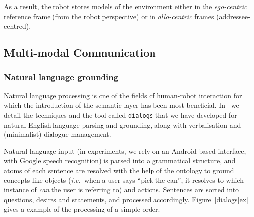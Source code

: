 \documentclass[preprint,3p,times]{elsarticle}
\newcommand{\ie}{{\textit{i.e.\ }}}
\begin{document}
As a result, the robot stores models of the environment either in the
\emph{ego-centric} reference frame (from the robot perspective) or in 
\emph{allo-centric} frames (addressee-centred).

\subsection{Multi-modal Communication}
\label{sect|com}

\subsubsection{Natural language grounding}

Natural language processing is one of the fields of human-robot interaction
for which the introduction of the semantic layer has been most beneficial.
In~\cite{Lemaignan2011a} we detail the techniques and the tool called
\texttt{dialogs} that we have developed for natural English language parsing and
grounding, along with verbalisation and (minimalist) dialogue management.

Natural language input (in experiments, we rely on an Android-based interface,
with Google speech recognition) is parsed into a grammatical structure, and
atoms of each sentence are resolved with the help of the ontology to ground
concepts like objects (\ie when a user says ``pick the can'', it resolves to which
instance of \emph{can} the user is referring to) and actions. Sentences are
sorted into questions, desires and statements, and processed accordingly.
Figure~\ref{dialogs|ex} gives a example of the processing of a simple order.
\end{document}
